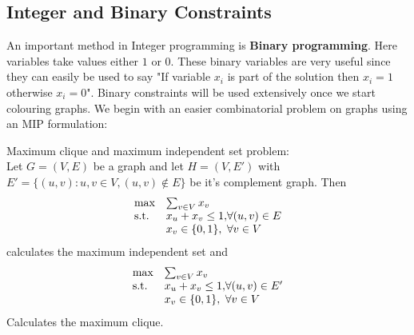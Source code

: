 \subsection{Integer and Binary Constraints}
An important method in Integer programming is \textbf{Binary programming}. Here variables take values either $1$ or $0$. These binary variables are very useful since they can easily be used to say "If variable $x_i$ is part of the solution then $x_i = 1$ otherwise $x_i = 0$". Binary constraints will be used extensively once we start colouring graphs. We begin with an easier combinatorial problem on graphs using an MIP formulation:
\begin{example}\label{independent set}
Maximum clique and maximum independent set problem:\\
Let $G=(V,E)$ be a graph and let $H=(V,E')$ with $E' = \{(u,v):u,v\in V, (u,v) \notin E\}$ be it's complement graph. Then
\begin{align}
\begin{array}{ll@{}ll}
\text{max} &\sum_{v\in V} x_v&\\
\text{s.t.} &x_u + x_v \leq 1,& \forall (u,v) \in E\\
&x_v\in\{0,1\},& \forall v \in V\\
\end{array}
\end{align}
calculates the maximum independent set and
\begin{align}
\begin{array}{ll@{}ll}
\text{max} &\sum_{v\in V} x_v&\\
\text{s.t.} &x_u + x_v \leq 1,& \forall (u,v) \in E'\\
&x_v\in\{0,1\},& \forall v \in V\\
\end{array}
\end{align}
Calculates the maximum clique.
\begin{figure}[H]
\centering
{}
\end{figure}
\end{example}
